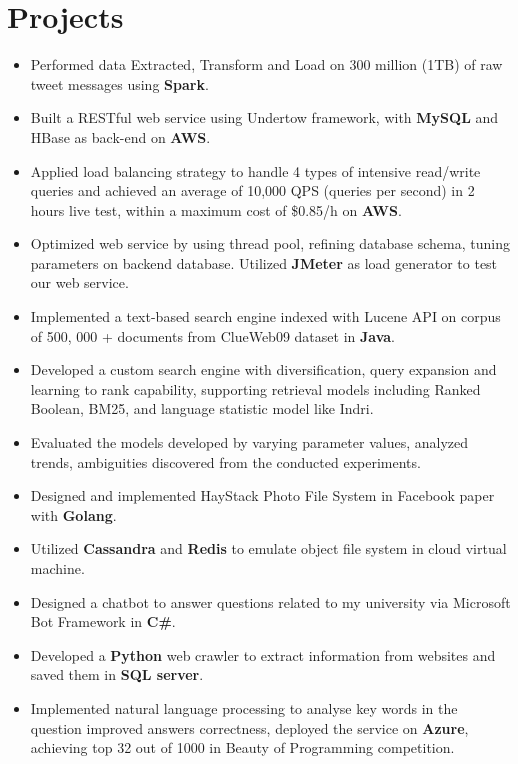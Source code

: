 \documentclass{resume}
\begin{document}
\section{Projects}
\begin{itemize}
\item{Performed data Extracted, Transform and Load on 300 million (1TB) of raw tweet messages using \textbf{Spark}.}
\item{Built a RESTful web service using Undertow framework, with \textbf{MySQL} and HBase as back-end on \textbf{AWS}.}
\item{Applied load balancing strategy to handle 4 types of intensive read/write queries and achieved an average of 10,000 QPS (queries per second) in 2 hours live test, within a maximum cost of \$0.85/h on \textbf{AWS}.}
\item{Optimized web service by using thread pool, refining database schema, tuning parameters on backend database. Utilized \textbf{JMeter} as load generator to test our web service.}
\end{itemize}
\begin{itemize}
\item{Implemented a text-based search engine indexed with Lucene API on corpus of 500, 000 + documents from ClueWeb09 dataset in \textbf{Java}.}
\item{Developed a custom search engine with diversification, query expansion and learning to rank capability, supporting retrieval models including Ranked Boolean, BM25, and language statistic model like Indri.}
\item{Evaluated the models developed by varying parameter values, analyzed trends, ambiguities discovered from the conducted experiments.}
\end{itemize}
\begin{itemize}
\item{Designed and implemented HayStack Photo File System in Facebook paper with \textbf{Golang}.}
\item{Utilized \textbf{Cassandra} and \textbf{Redis} to emulate object file system in cloud virtual machine.}
\end{itemize}
\begin{itemize}
\item{Designed a chatbot to answer questions related to my university via Microsoft Bot Framework in \textbf{C\#}.}
\item{Developed a \textbf{Python} web crawler to extract information from websites and saved them in  \textbf{SQL server}.}
\item{Implemented natural language processing to analyse key words in the question  improved answers correctness, deployed the service on \textbf{Azure}, achieving top 32 out of 1000 in Beauty of Programming competition.}
\end{itemize}
\end{document}
